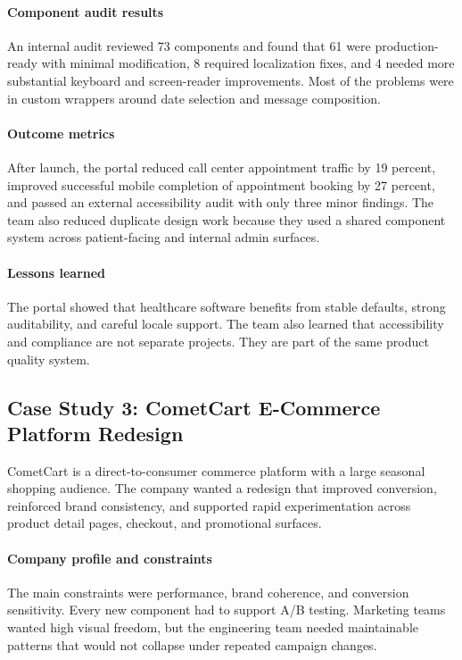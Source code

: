 \paragraph{Component audit results}
An internal audit reviewed 73 components and found that 61 were production-ready with minimal modification, 8 required localization fixes, and 4 needed more substantial keyboard and screen-reader improvements. Most of the problems were in custom wrappers around date selection and message composition.

\paragraph{Outcome metrics}
After launch, the portal reduced call center appointment traffic by 19 percent, improved successful mobile completion of appointment booking by 27 percent, and passed an external accessibility audit with only three minor findings. The team also reduced duplicate design work because they used a shared component system across patient-facing and internal admin surfaces.

\paragraph{Lessons learned}
The portal showed that healthcare software benefits from stable defaults, strong auditability, and careful locale support. The team also learned that accessibility and compliance are not separate projects. They are part of the same product quality system.

\subsection{Case Study 3: CometCart E-Commerce Platform Redesign}
CometCart is a direct-to-consumer commerce platform with a large seasonal shopping audience. The company wanted a redesign that improved conversion, reinforced brand consistency, and supported rapid experimentation across product detail pages, checkout, and promotional surfaces.

\paragraph{Company profile and constraints}
The main constraints were performance, brand coherence, and conversion sensitivity. Every new component had to support A/B testing. Marketing teams wanted high visual freedom, but the engineering team needed maintainable patterns that would not collapse under repeated campaign changes.

